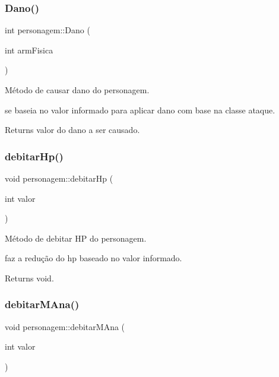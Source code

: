 \subsubsection{\texorpdfstring{Dano()}{Dano()}}
{\footnotesize\ttfamily int personagem\+::\+Dano (\begin{DoxyParamCaption}\item[{int}]{arm\+Fisica }\end{DoxyParamCaption})}



Método de causar dano do personagem. 

se baseia no valor informado para aplicar dano com base na classe ataque. \begin{DoxyReturn}{Returns}
valor do dano a ser causado. 
\end{DoxyReturn}
\mbox{\label{classpersonagem_a71499a8c512467cf812e0bca2b3e2989}} 
\subsubsection{\texorpdfstring{debitar\+Hp()}{debitarHp()}}
{\footnotesize\ttfamily void personagem\+::debitar\+Hp (\begin{DoxyParamCaption}\item[{int}]{valor }\end{DoxyParamCaption})}



Método de debitar HP do personagem. 

faz a redução do hp baseado no valor informado. \begin{DoxyReturn}{Returns}
void. 
\end{DoxyReturn}
\mbox{\label{classpersonagem_a785a1a249510545caa1d08652351f22c}} 
\subsubsection{\texorpdfstring{debitar\+M\+Ana()}{debitarMAna()}}
{\footnotesize\ttfamily void personagem\+::debitar\+M\+Ana (\begin{DoxyParamCaption}\item[{int}]{valor }\end{DoxyParamCaption})}



